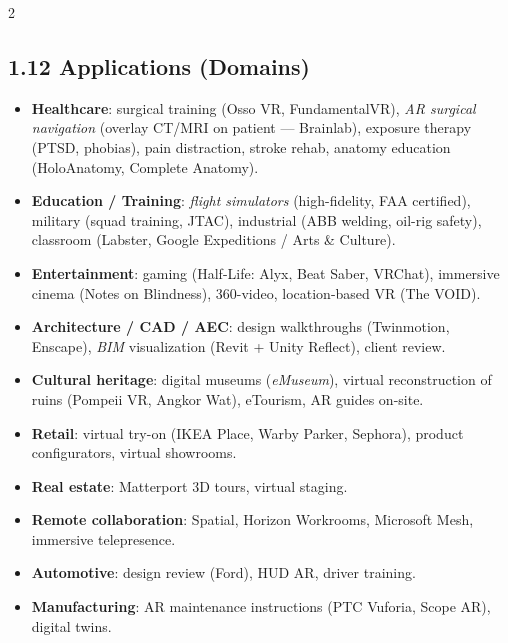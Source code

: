 \begin{paracol}{2}
\subsection*{1.12 Applications (Domains)}
\begin{itemize}[leftmargin=*,nosep]
  \item \textbf{Healthcare}: surgical training (Osso VR, FundamentalVR), \emph{AR surgical navigation} (overlay CT/MRI on patient — Brainlab), exposure therapy (PTSD, phobias), pain distraction, stroke rehab, anatomy education (HoloAnatomy, Complete Anatomy).
  \item \textbf{Education / Training}: \emph{flight simulators} (high-fidelity, FAA certified), military (squad training, JTAC), industrial (ABB welding, oil-rig safety), classroom (Labster, Google Expeditions / Arts \& Culture).
  \item \textbf{Entertainment}: gaming (Half-Life: Alyx, Beat Saber, VRChat), immersive cinema (Notes on Blindness), 360-video, location-based VR (The VOID).
  \item \textbf{Architecture / CAD / AEC}: design walkthroughs (Twinmotion, Enscape), \emph{BIM} visualization (Revit + Unity Reflect), client review.
  \item \textbf{Cultural heritage}: digital museums (\emph{eMuseum}), virtual reconstruction of ruins (Pompeii VR, Angkor Wat), eTourism, AR guides on-site.
  \item \textbf{Retail}: virtual try-on (IKEA Place, Warby Parker, Sephora), product configurators, virtual showrooms.
  \item \textbf{Real estate}: Matterport 3D tours, virtual staging.
  \item \textbf{Remote collaboration}: Spatial, Horizon Workrooms, Microsoft Mesh, immersive telepresence.
  \item \textbf{Automotive}: design review (Ford), HUD AR, driver training.
  \item \textbf{Manufacturing}: AR maintenance instructions (PTC Vuforia, Scope AR), digital twins.
\end{itemize}

\switchcolumn


\end{paracol}
